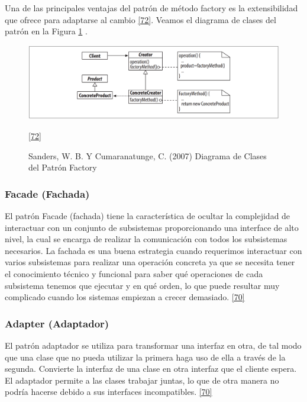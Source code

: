 Una de las principales ventajas del patrón de método factory es la extensibilidad que ofrece para adaptarse al cambio \hyperlink{b72}{[72]}. Veamos el diagrama de clases del patrón en la Figura \ref{fig:factory2} .

\begin{figure}[H]
	\begin{center}
		\includegraphics[width=1\textwidth]{images/marcoteorico/patrones/factory2}
		\caption{ Sanders, W. B. Y Cumaranatunge, C. (2007) Diagrama de Clases del Patrón Factory}
		\hyperlink{b72}{[72]} 
		\label{fig:factory2}
	\end{center}
\end{figure}

\subsubsection{Facade (Fachada)}
El patrón Facade (fachada) tiene la característica de ocultar la complejidad de interactuar con un conjunto de subsistemas proporcionando una interface de alto nivel, la cual se encarga de realizar la comunicación con todos los subsistemas necesarios. La fachada es una buena estrategia cuando requerimos interactuar con varios subsistemas para realizar una operación concreta ya que se necesita tener el conocimiento técnico y funcional para saber qué operaciones de cada subsistema tenemos que ejecutar y en qué orden, lo que puede resultar muy complicado cuando los sistemas empiezan a crecer demasiado. \hyperlink{b70}{[70]}

\subsubsection{Adapter (Adaptador)}
El patrón adaptador se utiliza para transformar una interfaz en otra, de tal modo que una clase que no pueda utilizar la primera haga uso de ella a través de la segunda. Convierte la interfaz de una clase en otra interfaz que el cliente espera. El adaptador permite a las clases trabajar juntas, lo que de otra manera no podría hacerse debido a sus interfaces incompatibles. \hyperlink{b70}{[70]}\\

